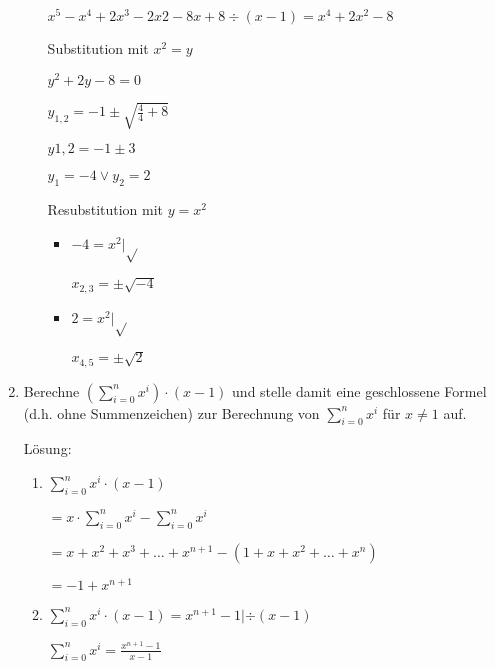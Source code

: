 \documentclass[main.tex]{subfiles}
\begin{document}
\begin{enumerate}
\begin{enumerate}
		            \(  x^5 - x^4 + 2x^3 -2x2 -8x +8 \div (x - 1) =  x^4 + 2x^2 - 8 \)

		            Substitution mit \( x^2 = y \)

		            \( y^2 + 2y - 8 = 0 \)

		            \( y_{1,2} = -1 \pm \sqrt{ \frac{4}{4} + 8} \)

		            \( y{1,2} = -1 \pm 3 \)

		            \(  y_1 = -4 \lor y_2 = 2 \)

		            Resubstitution mit \( y = x^2 \)
		            \begin{multicols}{2}
			            \begin{itemize}
				            \item[] \( -4 = x^2  | \sqrt{} \)

				                  \( x_{2,3} = \pm \sqrt{-4} \)
				            \item[] \( 2 = x^2 | \sqrt{} \)

				                  \( x_{4,5} = \pm \sqrt{2} \)
			            \end{itemize}
		            \end{multicols}
	      \end{enumerate}
	\item Berechne \( (\sum_{i = 0}^{n} x^i) \cdot ( x -1) \)
	      und stelle damit eine geschlossene Formel (d.h. ohne Summenzeichen) zur Berechnung von
	      \(\sum_{ i = 0}^{n} x^i \) für \( x \neq 1 \) auf.

	      Lösung:
	      \begin{enumerate}
		      \item \( \sum_{i = 0}^{n} x^i \cdot (x - 1) \)

		            \( = x \cdot \sum_{i = 0}^{n} x^i - \sum_{i = 0}^{n} x^i \)

		            \( = x + x^2 + x^3 + \dots + x^{n+1} - (1 + x + x^2 + \dots + x^n) \)

		            \( = -1 + x^{n+1} \)

			\item \( \sum_{i = 0}^{n} x^i \cdot (x - 1) = x^{n+1} -1  | \div (x-1) \)

		            \( \sum_{i = 0}^{n} x^i = \frac{ x^{n + 1} - 1 }{ x - 1 }  \)
	      \end{enumerate}
\end{enumerate}
\end{document}
